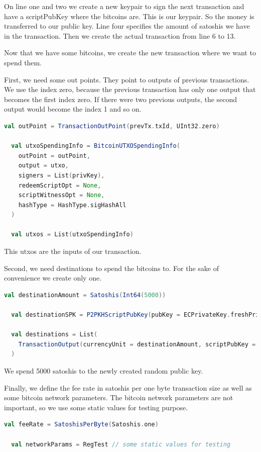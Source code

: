 On line one and two we create a new keypair to sign the next transaction and have a scriptPubKey where the bitcoins are.
This is our keypair.
So the money is transferred to our public key.
Line four specifies the amount of satoshis we have in the transaction.
Then we create the actual transaction from line 6 to 13.

Now that we have some bitcoins, we create the new transaction where we want to spend them.

First, we need some out points.
They point to outputs of previous transactions.
We use the index zero, because the previous transaction has only one output that becomes the first index zero.
If there were two previous outputs, the second output would become the index 1 and so on.
\begin{lstlisting}[language=scala]
  val outPoint = TransactionOutPoint(prevTx.txId, UInt32.zero)

  val utxoSpendingInfo = BitcoinUTXOSpendingInfo(
    outPoint = outPoint,
    output = utxo,
    signers = List(privKey),
    redeemScriptOpt = None,
    scriptWitnessOpt = None,
    hashType = HashType.sigHashAll
  )

  val utxos = List(utxoSpendingInfo)
\end{lstlisting}

This utxos are the inputs of our transaction.

Second, we need destinations to spend the bitcoins to.
For the sake of convenience we create only one.
\begin{lstlisting}[language=scala]
  val destinationAmount = Satoshis(Int64(5000))

  val destinationSPK = P2PKHScriptPubKey(pubKey = ECPrivateKey.freshPrivateKey.publicKey)

  val destinations = List(
    TransactionOutput(currencyUnit = destinationAmount, scriptPubKey = destinationSPK)
  )
\end{lstlisting}

We spend 5000 satoshis to the newly created random public key.

Finally, we define the fee rate in satoshis per one byte transaction size as well as some bitcoin network parameters.
The bitcoin network parameters are not important, so we use some static values for testing purpose.
\begin{lstlisting}[language=scala]
  val feeRate = SatoshisPerByte(Satoshis.one)

  val networkParams = RegTest // some static values for testing
\end{lstlisting}

